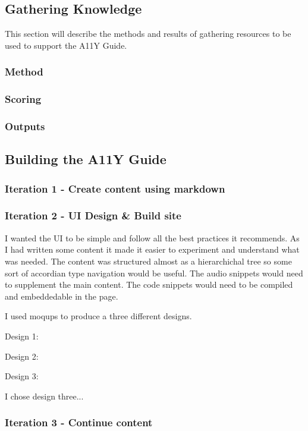 \subsection{Gathering Knowledge}
This section will describe the methods and results of gathering resources to
be used to support the A11Y Guide.

\subsubsection{Method}

\subsubsection{Scoring}
\subsubsection{Outputs}

\subsection{Building the A11Y Guide}
\subsubsection{Iteration 1 - Create content using markdown}

\subsubsection{Iteration 2 - UI Design \& Build site}
I wanted the UI to be simple and follow all the best practices it recommends.
As I had written some content it made it easier to experiment and understand
what was needed. The content was structured almost as a hierarchichal tree so
some sort of accordian type navigation would be useful. The audio snippets
would need to supplement the main content. The code snippets
would need to be compiled and embeddedable in the page.

I used moqups to produce a three different designs.

Design 1:

Design 2:

Design 3:

I chose design three...

\subsubsection{Iteration 3 - Continue content}

